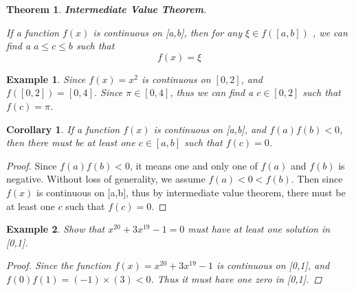 \documentclass{article}
\newtheorem{ex}{Example}
\newtheorem{thm}{Theorem}
\newtheorem{cor}{Corollary}
\begin{document}
\begin{thm}
	\textbf{Intermediate Value Theorem}.
	
	If a function $f(x)$ is continuous on [a,b], then for any $\xi\in f([a,b])$ , we can find a $a\leq c\leq b$ such that 
	\[ f(x) = \xi  \]
\end{thm}

\begin{ex}
	Since $f(x)=x^2$ is continuous on $[0,2]$, and $f([0,2])=[0,4]$. Since $\pi\in[0,4]$, thus we can find a $c\in[0,2]$ such that $f(c) = \pi$.
\end{ex}

\begin{cor}
	If a function $f(x)$ is continuous on [a,b], and $f(a)f(b)<0$, then there must be at least one $c\in[a,b]$ such that $f(c)=0$.
\end{cor}
\begin{proof}
	Since $f(a)f(b)<0$, it means one and only one of $f(a)$ and $f(b)$ is negative. Without loss of generality, we assume $f(a)<0<f(b)$. Then since $f(x)$ is continuous on [a,b], thus by intermediate value theorem, there must be at least one $c$ such that $f(c)=0$.
\end{proof}

\begin{ex}
	Show that $x^20 + 3x^19 -1 = 0$ must have at least one solution in [0,1].
	\begin{proof}
		Since the function $f(x) = x^20 + 3x^19 -1$ is continuous on [0,1], and $f(0)f(1)=(-1)\times(3) <0$. Thus it must have one zero in [0,1].
	\end{proof}
\end{ex}
\end{document}
